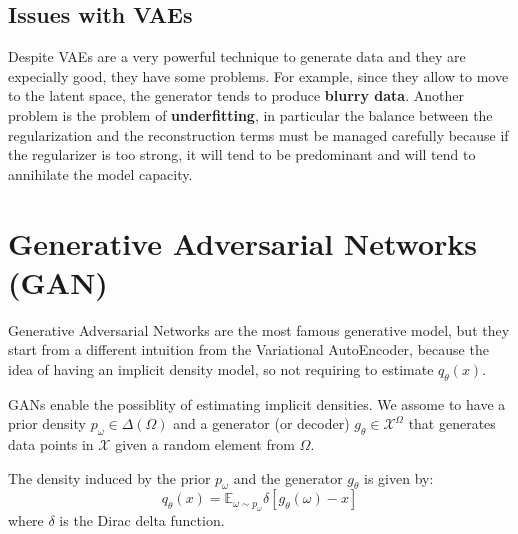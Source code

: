 \subsection{Issues with VAEs}
Despite VAEs are a very powerful technique to generate data and they are expecially good, they have some problems. For example, since they allow to move to the latent space, the generator tends to produce \textbf{blurry data}. Another problem is the problem of \textbf{underfitting}, in particular the balance between the regularization and the reconstruction terms must be managed carefully because if the regularizer is too strong, it will tend to be predominant and will tend to annihilate the model capacity.

\section{Generative Adversarial Networks (GAN)}
Generative Adversarial Networks are the most famous generative model, but they start from a different intuition from the Variational AutoEncoder, because the idea of having an implicit density model, so not requiring to estimate \(q_\theta(x)\).

GANs enable the possiblity of estimating implicit densities. We assome to have a prior density \(p_\omega \in \Delta(\Omega)\) and a generator (or decoder) \(g_\theta \in \mathcal{X}^\Omega\) that generates data points in \(\mathcal{X}\) given a random element from \(\Omega\).

The density induced by the prior \(p_\omega\) and the generator \(g_\theta\) is given by:
\begin{equation}
    q_\theta (x) = \mathbb{E}_{\omega \sim p_\omega} \delta \left[ g_\theta (\omega) - x \right]
\end{equation}
where \(\delta\) is the Dirac delta function.

